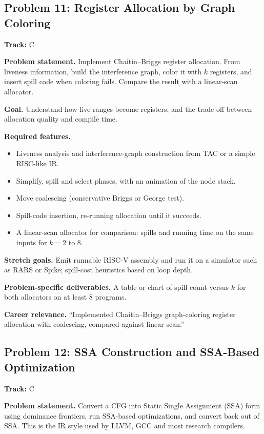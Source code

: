 \documentclass[11pt,a4paper]{article}
\newcommand{\fld}[1]{\par\smallskip\textbf{\color{accent}#1}\quad}
\newcommand{\meta}[1]{%
  \begin{tcolorbox}[colback=softbg,colframe=softbg,boxsep=2pt,left=4pt,right=4pt,top=2pt,bottom=2pt,arc=2pt]
  \small\textbf{Track:} #1
  \end{tcolorbox}}
\begin{document}
\subsection{Problem 11: Register Allocation by Graph Coloring}
\meta{C}

\fld{Problem statement.} Implement Chaitin--Briggs register allocation. From liveness information,
build the interference graph, color it with $k$ registers, and insert spill code when coloring fails.
Compare the result with a linear-scan allocator.

\fld{Goal.} Understand how live ranges become registers, and the trade-off between allocation quality and compile time.

\fld{Required features.}
\begin{itemize}
  \item Liveness analysis and interference-graph construction from TAC or a simple RISC-like IR.
  \item Simplify, spill and select phases, with an animation of the node stack.
  \item Move coalescing (conservative Briggs or George test).
  \item Spill-code insertion, re-running allocation until it succeeds.
  \item A linear-scan allocator for comparison: spills and running time on the same inputs for $k = 2$ to $8$.
\end{itemize}

\fld{Stretch goals.} Emit runnable RISC-V assembly and run it on a simulator such as RARS or Spike;
spill-cost heuristics based on loop depth.

\fld{Problem-specific deliverables.} A table or chart of spill count versus $k$ for both allocators on at least 8 programs.

\fld{Career relevance.} ``Implemented Chaitin--Briggs graph-coloring register allocation with coalescing, compared against linear scan.''

\subsection{Problem 12: SSA Construction and SSA-Based Optimization}
\meta{C}

\fld{Problem statement.} Convert a CFG into Static Single Assignment (SSA) form using dominance
frontiers, run SSA-based optimizations, and convert back out of SSA. This is the IR style used by
LLVM, GCC and most research compilers.
\end{document}
